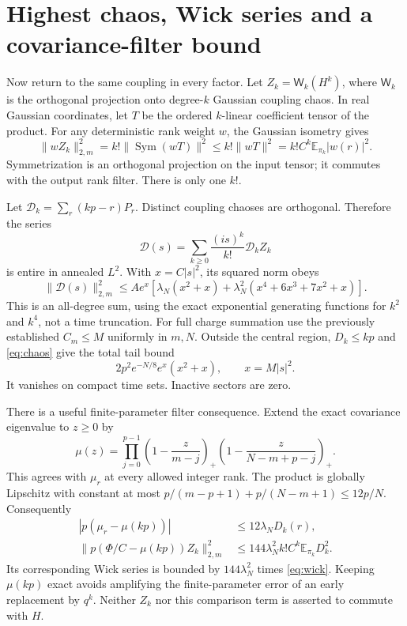 \documentclass[11pt,a4paper]{article}
\newcommand{\EE}{\mathbb E}
\newcommand{\W}{\mathsf W}
\begin{document}
\newpage
\section{Highest chaos, Wick series and a covariance-filter bound}
Now return to the same coupling in every factor. Let
$Z_k=\W_k(H^k)$, where $\W_k$ is the orthogonal projection onto
degree-$k$ Gaussian coupling chaos. In real Gaussian coordinates,
let $T$ be the ordered $k$-linear coefficient tensor of the product.
For any deterministic rank weight $w$, the Gaussian isometry gives
\begin{equation}
 \|wZ_k\|_{2,m}^2=k!\|\operatorname{Sym}(wT)\|^2
 \le k!\|wT\|^2=k!C^k\EE_{\pi_k}|w(r)|^2.\label{eq:chaos}
\end{equation}
Symmetrization is an orthogonal projection on the input tensor;
it commutes with the output rank filter. There is only one $k!$.

Let $\mathcal D_k=\sum_r(kp-r)P_r$. Distinct coupling chaoses
are orthogonal. Therefore the series
\begin{equation}
 \mathcal D(s)=\sum_{k\ge0}\frac{(is)^k}{k!}\mathcal D_k Z_k
\end{equation}
is entire in annealed $L^2$. With $x=C|s|^2$, its squared norm obeys
\begin{equation}
 \|\mathcal D(s)\|_{2,m}^2\le A e^x
 \left[\lambda_N(x^2+x)
 +\lambda_N^2(x^4+6x^3+7x^2+x)\right].\label{eq:wick}
\end{equation}
This is an all-degree sum, using the exact exponential generating
functions for $k^2$ and $k^4$, not a time truncation.
For full charge summation use the previously established
$C_m\le M$ uniformly in $m,N$. Outside the central region,
$D_k\le kp$ and \eqref{eq:chaos} give the total tail bound
\begin{equation}
 2p^2e^{-N/8}e^x(x^2+x),\qquad x=M|s|^2.
\end{equation}
It vanishes on compact time sets. Inactive sectors are zero.

There is a useful finite-parameter filter consequence. Extend the
exact covariance eigenvalue to $z\ge0$ by
\begin{equation}
 \mu(z)=\prod_{j=0}^{p-1}
 \left(1-\frac z{m-j}\right)_+
 \left(1-\frac z{N-m+p-j}\right)_+.
\end{equation}
This agrees with $\mu_r$ at every allowed integer rank. The product
is globally Lipschitz with constant at most
$p/(m-p+1)+p/(N-m+1)\le12p/N$. Consequently
\begin{align}
 |p(\mu_r-\mu(kp))|&\le12\lambda_ND_k(r),\\
 \|p(\Phi/C-\mu(kp))Z_k\|_{2,m}^2
 &\le144\lambda_N^2 k!C^k\EE_{\pi_k}D_k^2.\label{eq:filter}
\end{align}
Its corresponding Wick series is bounded by $144\lambda_N^2$
times \eqref{eq:wick}. Keeping $\mu(kp)$ exact avoids amplifying
the finite-parameter error of an early replacement by $q^k$.
Neither $Z_k$ nor this comparison term is asserted to commute with $H$.
\end{document}
